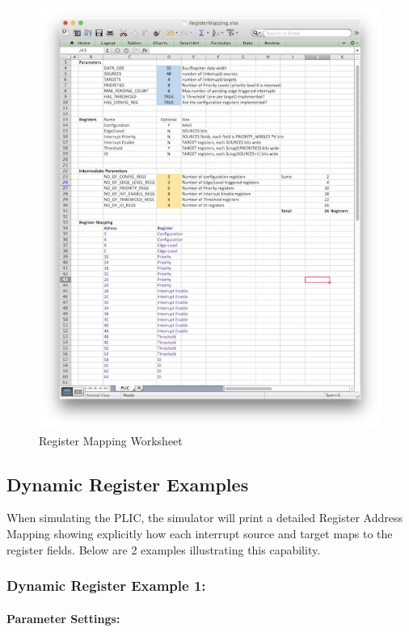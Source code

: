 \begin{figure}[!ht]
\includegraphics{assets/img/AHB-Lite_PLIC_Worksheet.png}
\caption{Register Mapping Worksheet}
\label{fig:WORKSHEET}
\end{figure}

\clearpage

\subsection{Dynamic Register Examples}

When simulating the PLIC, the simulator will print a detailed Register Address
Mapping showing explicitly how each interrupt source and target maps to the register fields. Below are 2 examples illustrating this capability.

\subsubsection{Dynamic Register Example 1:}\label{example-1}

\paragraph{Parameter Settings:}
\ifdefined\MARKDOWN
\else
~\\
\fi

